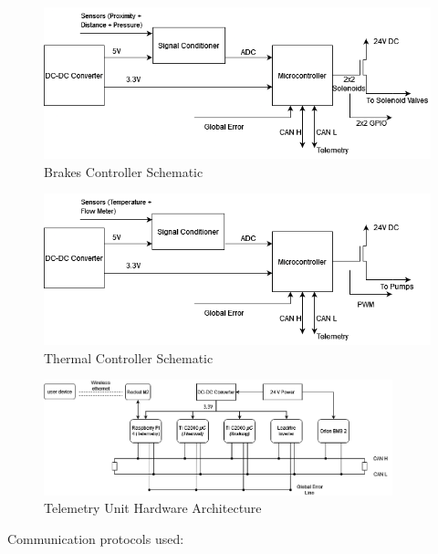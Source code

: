     \begin{figure}[H]
        \centering
        \includegraphics[width=0.9\linewidth]{texfiles/elec/eimg/Brakesystems}
        \caption{Brakes Controller Schematic} 
        \label{fig:Brakes Controller Schematic}
    \end{figure}
 \begin{figure}[H]
        \centering
        \includegraphics[width=0.9\linewidth]{texfiles/elec/eimg/thermalsystems}
        \caption{Thermal Controller Schematic}
        \label{fig:Thermal Controller Schematic}
    \end{figure}
 \begin{figure}[H]
        \centering
        \includegraphics[width=0.9\textwidth]{texfiles/elec/eimg/telemetrysystems}
        \caption{Telemetry Unit Hardware Architecture}
        \label{fig:Telemetry Unit Hardware Architecture}
\end{figure}
Communication protocols used: 
